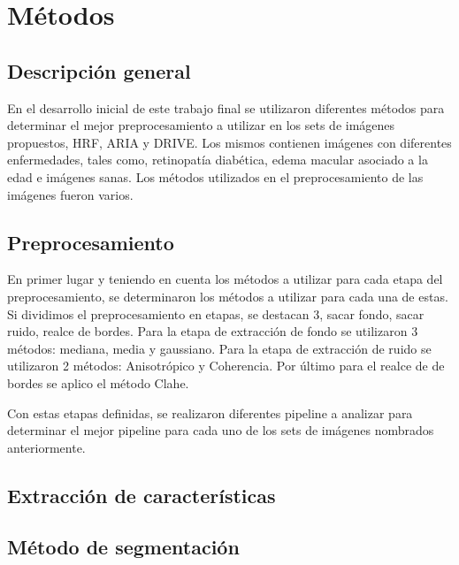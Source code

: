 
\chapter{M\'etodos} %

\label{Chapter3} %


\section{Descripci\'on general}

En el desarrollo inicial de este trabajo final se utilizaron diferentes m\'etodos para determinar el mejor preprocesamiento a utilizar en los sets de im\'agenes propuestos, HRF, ARIA y DRIVE. Los mismos contienen im\'agenes con diferentes enfermedades, tales como, retinopat\'ia diab\'etica, edema macular asociado a la edad e im\'agenes sanas.
Los m\'etodos utilizados en el preprocesamiento de las im\'agenes fueron varios.

\section{Preprocesamiento}
En primer lugar y teniendo en cuenta los m\'etodos a utilizar para cada etapa del preprocesamiento, se determinaron los m\'etodos a utilizar para cada una de estas. Si dividimos el preprocesamiento en etapas, se destacan 3, sacar fondo, sacar ruido, realce de bordes. Para la etapa de extracci\'on de fondo se utilizaron 3 m\'etodos: mediana, media y gaussiano. Para la etapa de extracci\'on de ruido se utilizaron 2 m\'etodos: Anisotr\'opico y Coherencia. Por \'ultimo para el realce de de bordes se aplico el m\'etodo Clahe.

Con estas etapas definidas, se realizaron diferentes pipeline a analizar para determinar el mejor pipeline para cada uno de los sets de im\'agenes nombrados anteriormente.




\section{Extracci\'on de caracter\'isticas}



\section{M\'etodo de segmentaci\'on}


